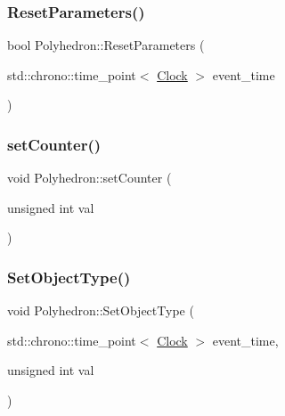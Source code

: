 \mbox{\label{classPolyhedron_ae90c347cfb8ca8028a260e88bef2b45c}} 
\subsubsection{\texorpdfstring{Reset\+Parameters()}{ResetParameters()}}
{\footnotesize\ttfamily bool Polyhedron\+::\+Reset\+Parameters (\begin{DoxyParamCaption}\item[{std\+::chrono\+::time\+\_\+point$<$ \mbox{\hyperlink{universe_8h_a0ef8d951d1ca5ab3cfaf7ab4c7a6fd80}{Clock}} $>$}]{event\+\_\+time }\end{DoxyParamCaption})}

\mbox{\label{classPolyhedron_ad74a1ccc28a08bc2dbc186e5f2c1f694}} 
\subsubsection{\texorpdfstring{set\+Counter()}{setCounter()}}
{\footnotesize\ttfamily void Polyhedron\+::set\+Counter (\begin{DoxyParamCaption}\item[{unsigned int}]{val }\end{DoxyParamCaption})\hspace{0.3cm}{\ttfamily [inline]}}

\mbox{\label{classPolyhedron_a014c8f981aef5fa1d70dcb5be6a0875a}} 
\subsubsection{\texorpdfstring{Set\+Object\+Type()}{SetObjectType()}}
{\footnotesize\ttfamily void Polyhedron\+::\+Set\+Object\+Type (\begin{DoxyParamCaption}\item[{std\+::chrono\+::time\+\_\+point$<$ \mbox{\hyperlink{universe_8h_a0ef8d951d1ca5ab3cfaf7ab4c7a6fd80}{Clock}} $>$}]{event\+\_\+time,  }\item[{unsigned int}]{val }\end{DoxyParamCaption})}

